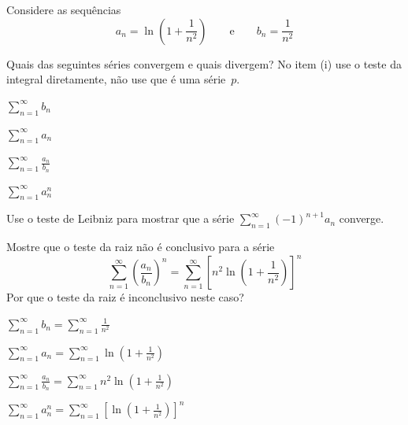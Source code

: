 \begin{exercises*}
\begin{exercise}
  Considere as sequências
  \[
    a_n = \ln\left(1+\frac{1}{n^2}\right)
    \qquad\text{e}\qquad
    b_n = \frac{1}{n^2}
  \]
  \vspace{-\baselineskip}
  \begin{alphalist}
    \item Quais das seguintes séries convergem e quais divergem?
          No item (i) use o teste da integral diretamente, não use que é uma série~$p$.
    \begin{romanlist}[2]
      \item \( \sum_{n=1}^\infty b_n \)
      \item \( \sum_{n=1}^\infty a_n \)
      \item \( \sum_{n=1}^\infty \frac{a_n}{b_n} \)
      \item \( \sum_{n=1}^\infty a_n^n \)
    \end{romanlist}
    \item Use o teste de Leibniz para mostrar que a série
    \( \sum_{n=1}^\infty(-1)^{n+1}a_n \)
    converge.
    \item Mostre que o teste da raiz não é conclusivo para a série
    \[
      \sum_{n=1}^\infty \left(\frac{a_n}{b_n}\right)^n =
      \sum_{n=1}^\infty \left[n^2\ln\left(1+\frac{1}{n^2}\right)\right]^n
    \]
    Por que o teste da raiz é inconclusivo neste caso? \\
  \end{alphalist}
\begin{answer}
  \begin{alphalist}
    \item
    \begin{minipage}[t]{0.9\linewidth}
      \begin{romanlist}
        \item \(\sum_{n=1}^\infty b_n=\sum_{n=1}^\infty \frac{1}{n^2}\)
        \item \(\sum_{n=1}^\infty a_n=\sum_{n=1}^\infty \ln\left(1+\frac{1}{n^2}\right)\)
        \item \(\sum_{n=1}^\infty \frac{a_n}{b_n}=\sum_{n=1}^\infty n^2\ln\left(1+\frac{1}{n^2}\right)\)
        \item \(\sum_{n=1}^\infty a_n^n=\sum_{n=1}^\infty \left[\ln\left(1+\frac{1}{n^2}\right)\right]^n\)
      \end{romanlist}
    \end{minipage}
  \end{alphalist}
\end{answer}
\end{exercise}


\end{exercises*}
